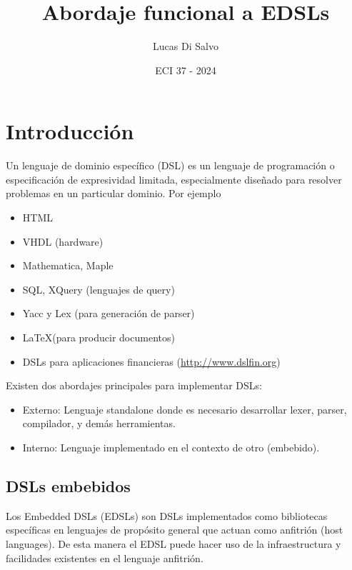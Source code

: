 \documentclass{article}
\title{\Huge Abordaje funcional a EDSLs}
\author{Lucas Di Salvo}
\date{ECI 37 - 2024}
\newcommand{\imp}[1]{\textcolor{color1}{#1}}
\begin{document}
\maketitle

\tableofcontents

\thispagestyle{empty}

\newpage

\section{Introducción}\label{sec:introduccion}

Un lenguaje de dominio específico (DSL) es un lenguaje de programación o especificación de expresividad limitada, especialmente diseñado para resolver problemas en un particular dominio. Por ejemplo
\begin{itemize}
\item HTML
\item VHDL (hardware)
\item Mathematica, Maple
\item SQL, XQuery (lenguajes de query)
\item Yacc y Lex (para generación de parser)
\item \LaTeX (para producir documentos)
\item DSLs para aplicaciones financieras (\url{http://www.dslfin.org})
\end{itemize}
Existen dos abordajes principales para implementar DSLs:

\begin{itemize}
\item \imp{Externo}: Lenguaje standalone donde es necesario desarrollar lexer, parser, compilador, y demás herramientas.
\item \imp{Interno}: Lenguaje implementado en el contexto de otro (embebido).
\end{itemize}

\subsection{DSLs embebidos}\label{subsec:dsls_embebidos}

Los \imp{Embedded DSLs} (EDSLs) son DSLs implementados como bibliotecas específicas en lenguajes de propósito general que actuan como anfitrión (host languages). De esta manera el EDSL puede hacer uso de la infraestructura y facilidades existentes en el lenguaje anfitrión.

\
\end{document}
